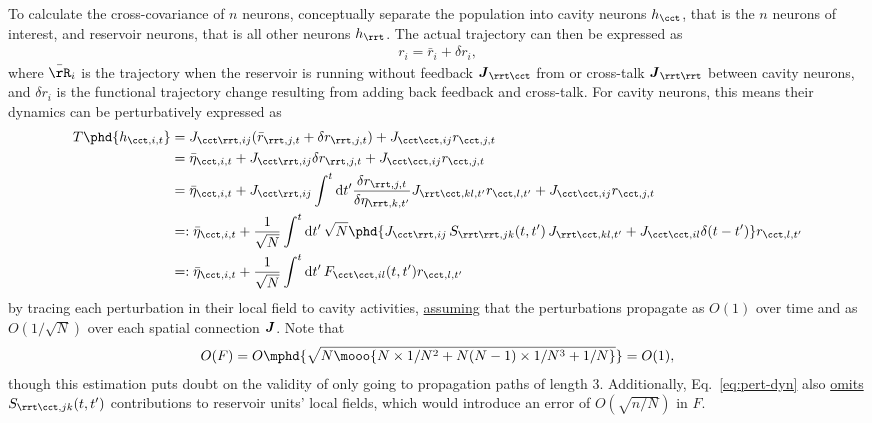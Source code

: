 \documentclass[11pt,openany,oneside]{article} %
\begin{document}
To calculate the cross-covariance of $n$ neurons, conceptually separate the population into cavity
neurons $h_\cct$, that is the $n$ neurons of interest, and reservoir neurons, that is all other
neurons $h_\rrt$.  The actual trajectory can then be expressed as 
\begin{align*}
  r_i = \bar{r}_i + \delta r_i,
\end{align*}
where $\bar{\rR}_i$ is the trajectory when the reservoir is running without feedback
$\bd{J}_{\rrt\cct}$ from or cross-talk $\bd{J}_{\rrt\rrt}$ between cavity neurons, and $\delta r_i$
is the functional trajectory change resulting from adding back feedback and cross-talk.  For cavity
neurons, this means their dynamics can be perturbatively expressed as
\begin{equation}
  \label{eq:pert-dyn}
  \begin{aligned}
      T\phd{h_{\cct,i,t}} &=J_{\cct\rrt,ij}(\bar{r}_{\rrt, j,t} + \delta r_{\rrt, j,t}) + J_{\cct\cct,ij}r_{\cct, j,t}\\
  &=\bar{\eta}_{\cct, i,t} + J_{\cct\rrt,ij}\delta r_{\rrt, j,t} + J_{\cct\cct,ij}r_{\cct, j,t}\\
  &=\bar{\eta}_{\cct, i,t} + J_{\cct\rrt,ij}\int^t\d t'\frac{\delta r_{\rrt, j,t}}{\delta \eta_{\rrt, k,t'}}J_{\rrt\cct, kl,t'} r_{\cct,l,t'} + J_{\cct\cct,ij}r_{\cct, j,t}\\
  &=:\bar{\eta}_{\cct, i,t} + \frac{1}{\sqrt{N}}\int^t\d t'\,\sqrt{N}\phd{J_{\cct\rrt,ij}\,S_{\rrt\rrt,jk}(t,t')\,J_{\rrt\cct, kl,t'}+J_{\cct\cct,il}\delta(t-t')} r_{\cct,l,t'}\\
  &=:\bar{\eta}_{\cct, i,t} + \frac{1}{\sqrt{N}}\int^t\d t'\,F_{\cct\cct,il}(t,t') r_{\cct,l,t'}
  \end{aligned}
\end{equation}
by tracing each perturbation in their local field to cavity activities, \uline{assuming} that the
perturbations propagate as $O(1)$ over time and as $O(1/\sqrt{N})$ over each spatial connection
$\boldsymbol{J}$.  Note that
\begin{align*}
  O(F) = O\mphd{\sqrt{N\mooo{N\times 1/N^2+N(N-1)\times 1/N^3+1/N}}}=O(1),
\end{align*}
though this estimation puts doubt on the validity of only going to propagation paths of length $3$.
Additionally, Eq.~\ref{eq:pert-dyn} also \uline{omits} $S_{\rrt\cct,jk}(t,t')$ contributions to
reservoir units' local fields, which would introduce an error of $O(\sqrt{n/N})$ in $F$.
\end{document}
